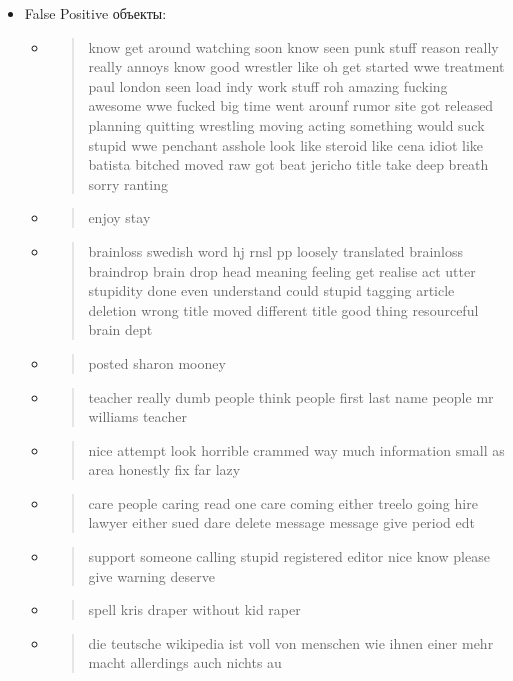 \documentclass[14pt]{extarticle}
\begin{document}
\begin{itemize}
\item False Positive объекты:
\begin{itemize}
    \item \begin{quote} know get around watching soon know seen punk stuff reason really really annoys know good wrestler like oh get started wwe treatment paul london seen load indy work stuff roh amazing fucking awesome wwe fucked big time went arounf rumor site got released planning quitting wrestling moving acting something would suck stupid wwe penchant asshole look like steroid like cena idiot like batista bitched moved raw got beat jericho title take deep breath sorry ranting \end{quote}
    \item \begin{quote} enjoy stay \end{quote}
    \item \begin{quote} brainloss swedish word hj rnsl pp loosely translated brainloss braindrop brain drop head meaning feeling get realise act utter stupidity done even understand could stupid tagging article deletion wrong title moved different title good thing resourceful brain dept \end{quote}
    \item \begin{quote} posted sharon mooney \end{quote}
    \item \begin{quote} teacher really dumb people think people first last name people mr williams teacher \end{quote}
    \item \begin{quote} nice attempt look horrible crammed way much information small as area honestly fix far lazy \end{quote}
    \item \begin{quote} care people caring read one care coming either treelo going hire lawyer either sued dare delete message message give period edt \end{quote}
    \item \begin{quote} support someone calling stupid registered editor nice know please give warning deserve \end{quote}
    \item \begin{quote} spell kris draper without kid raper \end{quote}
    \item \begin{quote} die teutsche wikipedia ist voll von menschen wie ihnen einer mehr macht allerdings auch nichts au \end{quote}
\end{itemize}
\end{itemize}
\end{document}

